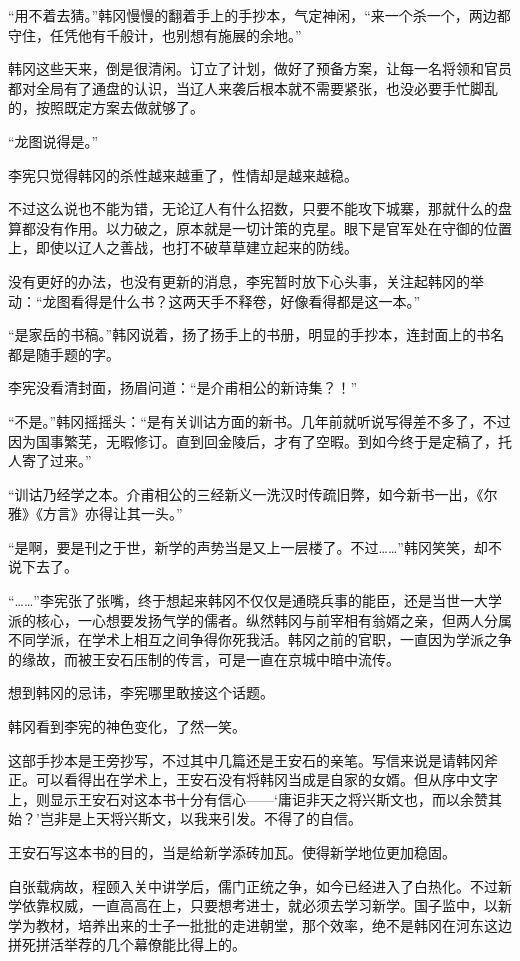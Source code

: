 “用不着去猜。”韩冈慢慢的翻着手上的手抄本，气定神闲，“来一个杀一个，两边都守住，任凭他有千般计，也别想有施展的余地。”

韩冈这些天来，倒是很清闲。订立了计划，做好了预备方案，让每一名将领和官员都对全局有了通盘的认识，当辽人来袭后根本就不需要紧张，也没必要手忙脚乱的，按照既定方案去做就够了。

“龙图说得是。”

李宪只觉得韩冈的杀性越来越重了，性情却是越来越稳。

不过这么说也不能为错，无论辽人有什么招数，只要不能攻下城寨，那就什么的盘算都没有作用。以力破之，原本就是一切计策的克星。眼下是官军处在守御的位置上，即使以辽人之善战，也打不破草草建立起来的防线。

没有更好的办法，也没有更新的消息，李宪暂时放下心头事，关注起韩冈的举动：“龙图看得是什么书？这两天手不释卷，好像看得都是这一本。”

“是家岳的书稿。”韩冈说着，扬了扬手上的书册，明显的手抄本，连封面上的书名都是随手题的字。

李宪没看清封面，扬眉问道：“是介甫相公的新诗集？！”

“不是。”韩冈摇摇头：“是有关训诂方面的新书。几年前就听说写得差不多了，不过因为国事繁芜，无暇修订。直到回金陵后，才有了空暇。到如今终于是定稿了，托人寄了过来。”

“训诂乃经学之本。介甫相公的三经新义一洗汉时传疏旧弊，如今新书一出，《尔雅》《方言》亦得让其一头。”

“是啊，要是刊之于世，新学的声势当是又上一层楼了。不过……”韩冈笑笑，却不说下去了。

“……”李宪张了张嘴，终于想起来韩冈不仅仅是通晓兵事的能臣，还是当世一大学派的核心，一心想要发扬气学的儒者。纵然韩冈与前宰相有翁婿之亲，但两人分属不同学派，在学术上相互之间争得你死我活。韩冈之前的官职，一直因为学派之争的缘故，而被王安石压制的传言，可是一直在京城中暗中流传。

想到韩冈的忌讳，李宪哪里敢接这个话题。

韩冈看到李宪的神色变化，了然一笑。

这部手抄本是王旁抄写，不过其中几篇还是王安石的亲笔。写信来说是请韩冈斧正。可以看得出在学术上，王安石没有将韩冈当成是自家的女婿。但从序中文字上，则显示王安石对这本书十分有信心——‘庸讵非天之将兴斯文也，而以余赞其始？’岂非是上天将兴斯文，以我来引发。不得了的自信。

王安石写这本书的目的，当是给新学添砖加瓦。使得新学地位更加稳固。

自张载病故，程颐入关中讲学后，儒门正统之争，如今已经进入了白热化。不过新学依靠权威，一直高高在上，只要想考进士，就必须去学习新学。国子监中，以新学为教材，培养出来的士子一批批的走进朝堂，那个效率，绝不是韩冈在河东这边拼死拼活举荐的几个幕僚能比得上的。

